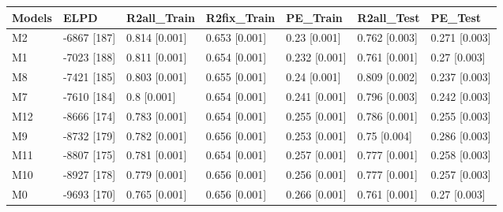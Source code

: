\begin{table}[ht]
\centering
\begin{tabular}{lllllll}
  \hline
Models & ELPD & R2all\_Train & R2fix\_Train & PE\_Train & R2all\_Test & PE\_Test \\ 
  \hline
M2 & -6867 [187] & 0.814 [0.001] & 0.653 [0.001] & 0.23 [0.001] & 0.762 [0.003] & 0.271 [0.003] \\ 
  M1 & -7023 [188] & 0.811 [0.001] & 0.654 [0.001] & 0.232 [0.001] & 0.761 [0.001] & 0.27 [0.003] \\ 
  M8 & -7421 [185] & 0.803 [0.001] & 0.655 [0.001] & 0.24 [0.001] & 0.809 [0.002] & 0.237 [0.003] \\ 
  M7 & -7610 [184] & 0.8 [0.001] & 0.654 [0.001] & 0.241 [0.001] & 0.796 [0.003] & 0.242 [0.003] \\ 
  M12 & -8666 [174] & 0.783 [0.001] & 0.654 [0.001] & 0.255 [0.001] & 0.786 [0.001] & 0.255 [0.003] \\ 
  M9 & -8732 [179] & 0.782 [0.001] & 0.656 [0.001] & 0.253 [0.001] & 0.75 [0.004] & 0.286 [0.003] \\ 
  M11 & -8807 [175] & 0.781 [0.001] & 0.654 [0.001] & 0.257 [0.001] & 0.777 [0.001] & 0.258 [0.003] \\ 
  M10 & -8927 [178] & 0.779 [0.001] & 0.656 [0.001] & 0.256 [0.001] & 0.777 [0.001] & 0.257 [0.003] \\ 
  M0 & -9693 [170] & 0.765 [0.001] & 0.656 [0.001] & 0.266 [0.001] & 0.761 [0.001] & 0.27 [0.003] \\ 
   \hline
\end{tabular}
\end{table}
